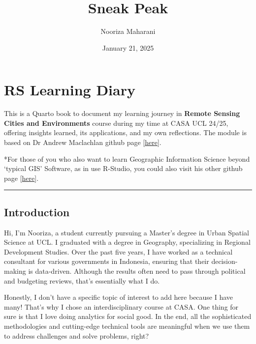\documentclass[
  letterpaper,
  DIV=11,
  numbers=noendperiod]{scrreprt}
\title{Sneak Peak}
\author{Nooriza Maharani}
\date{January 21, 2025}
\renewcommand*\contentsname{Table of contents}
\newcommand\contentsname{Table of contents}
\begin{document}
\maketitle
\ifdefined\Shaded\renewenvironment{Shaded}{\begin{tcolorbox}[enhanced, borderline west={3pt}{0pt}{shadecolor}, interior hidden, boxrule=0pt, breakable, frame hidden, sharp corners]}{\end{tcolorbox}}\fi

\renewcommand*\contentsname{Table of contents}
{
\hypersetup{linkcolor=}
\setcounter{tocdepth}{2}
\tableofcontents
}

\hypertarget{rs-learning-diary}{%
\chapter{RS Learning Diary}\label{rs-learning-diary}}

This is a Quarto book to document my learning journey in \textbf{Remote
Sensing Cities and Environments} course during my time at CASA UCL
24/25, offering insights learned, its applications, and my own
reflections. The module is based on Dr Andrew Maclachlan github page
{[}\href{https://andrewmaclachlan.github.io/CASA0023/.}{here}{]}.

*For those of you who also want to learn Geographic Information Science
beyond `typical GIS' Software, as in use R-Studio, you could also visit
his other github page
{[}\href{https://andrewmaclachlan.github.io/CASA0005repo/index.html}{here}{]}.

\begin{center}\rule{0.5\linewidth}{0.5pt}\end{center}

\hypertarget{introduction}{%
\section{Introduction}\label{introduction}}

Hi, I'm Nooriza, a student currently pursuing a Master's degree in Urban
Spatial Science at UCL. I graduated with a degree in Geography,
specializing in Regional Development Studies. Over the past five years,
I have worked as a technical consultant for various governments in
Indonesia, ensuring that their decision-making is data-driven. Although
the results often need to pass through political and budgeting reviews,
that's essentially what I do.

Honestly, I don't have a specific topic of interest to add here because
I have many! That's why I chose an interdisciplinary course at CASA. One
thing for sure is that I love doing analytics for social good. In the
end, all the sophisticated methodologies and cutting-edge technical
tools are meaningful when we use them to address challenges and solve
problems, right?
\end{document}
